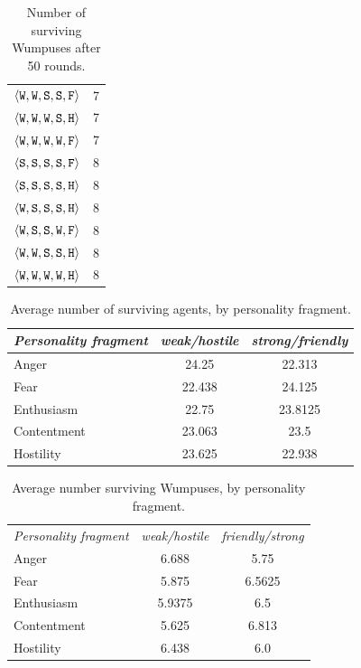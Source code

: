 \begin{table}
{{\begin{minipage}[b]{0.42\hsize}
\begin{tabular}{ l | c }
					$\langle \mathtt{W},\mathtt{W}, \mathtt{S}, \mathtt{S}, \mathtt{F} \rangle$ & 7\\
					$\langle \mathtt{W},\mathtt{W}, \mathtt{W}, \mathtt{S}, \mathtt{H} \rangle$ & 7\\
					$\langle \mathtt{W},\mathtt{W}, \mathtt{W}, \mathtt{W}, \mathtt{F} \rangle$ & 7\\
					$\langle \mathtt{S},\mathtt{S}, \mathtt{S}, \mathtt{S}, \mathtt{F} \rangle$ & 8\\
					$\langle \mathtt{S},\mathtt{S}, \mathtt{S}, \mathtt{S}, \mathtt{H} \rangle$ & 8\\
					$\langle \mathtt{W},\mathtt{S}, \mathtt{S}, \mathtt{S}, \mathtt{H} \rangle$ & 8\\
					$\langle \mathtt{W},\mathtt{S}, \mathtt{S}, \mathtt{W}, \mathtt{F} \rangle$ & 8\\
					$\langle \mathtt{W},\mathtt{W}, \mathtt{S}, \mathtt{S}, \mathtt{H} \rangle$ & 8\\
					$\langle \mathtt{W},\mathtt{W}, \mathtt{W}, \mathtt{W}, \mathtt{H} \rangle$ & 8\\
					\hline
				\end{tabular}
				\caption{Number of surviving Wumpuses after 50 rounds.}
				\label{tab:numWumpuses}
			\end{minipage}
			\hfill
		}}
	\end{table}
	
\begin{table}
	\centering
	\begin{tabular}{ l | c | c }
		\emph{Personality fragment} & \emph{weak/hostile} & \emph{ strong/friendly} \\
		\hline
			Anger & 24.25 & 22.313\\
			Fear & 22.438 & 24.125\\
			Enthusiasm & 22.75 & 23.8125\\
			Contentment & 23.063 & 23.5\\
			Hostility & 23.625 & 22.938\\
		\hline
	\end{tabular}
	\caption{Average number of surviving agents, by personality fragment.}
	\label{tab:numAgentsAvg}
\end{table}

\begin{table}
	\centering
	\begin{tabular}{ l | c | c }
		\emph{Personality fragment} & \emph{weak/hostile} & \emph{friendly/strong} \\
			Anger & 6.688 & 5.75\\
			Fear & 5.875 & 6.5625\\
			Enthusiasm & 5.9375 & 6.5\\
			Contentment & 5.625 & 6.813\\
			Hostility & 6.438 & 6.0\\
		\hline
	\end{tabular}
	\caption{Average number surviving Wumpuses, by personality fragment.}
	\label{tab:numWumpusesAvg}
\end{table}


